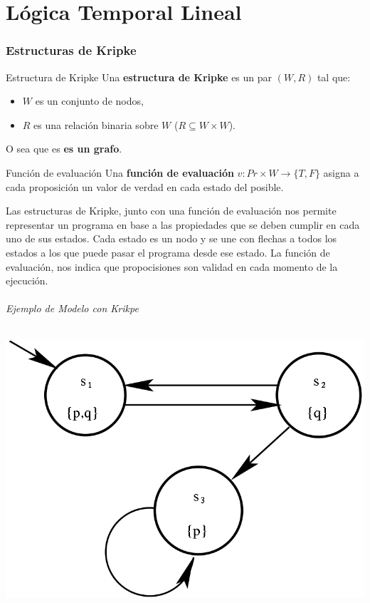 \part{Lógica Temporal Lineal}
\section{Estructuras de Kripke}
\begin{definicion}{Estructura de Kripke}
Una \textbf{estructura de Kripke} es un par $(W,R)$ tal que:
\begin{itemize}
\item $W$ es un conjunto de nodos,
\item $R$ es una relación binaria sobre $W$ ($R\subseteq W\times W$).
\end{itemize}

O sea que es \textbf{es un grafo}. 
\end{definicion}

\begin{definicion}{Función de evaluación}
Una \textbf{función de evaluación} $v:Pr\times W \to \{T,F\}$ asigna a cada proposición un valor de verdad en cada estado del posible.
\end{definicion}

Las estructuras de Kripke, junto con una función de evaluación nos permite representar un programa en base a las propiedades que se deben cumplir en cada uno de sus estados. Cada estado es un nodo y se une con flechas a todos los estados a los que puede pasar el programa desde ese estado. La función de evaluación, nos indica que propocisiones son validad en cada momento de la ejecución.

\paragraph{Ejemplo de Modelo con Krikpe}
\begin{center}
    \includegraphics[scale=0.3]{imagenes/kripke.png}
\end{center}

